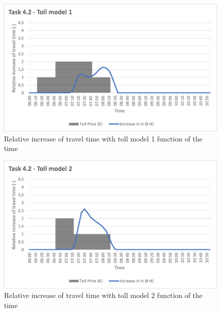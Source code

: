 \documentclass[a4paper, 12pt,oneside]{article}
\begin{document}
\begin{minipage}[c]{0.5\textwidth}
\begin{figure}[H]
    \centering
    \includegraphics[width=1\textwidth]{Images/Step4/Task4.2_Toll_model_1.png}
    \caption{Relative increase of travel time with toll model 1 function of the time}
    \label{fig:Relative increase of travel time with toll model 1 function of the time}
\end{figure}
\end{minipage}
\begin{minipage}[c]{0.5\textwidth}
\begin{figure}[H]
    \centering
    \includegraphics[width=1\textwidth]{Images/Step4/Task4.2_Toll_model_2.png}
    \caption{Relative increase of travel time with toll model 2 function of the time}
    \label{fig:Relative increase of travel time with toll model 2 function of the time}
\end{figure}
\end{minipage}
\end{document}

